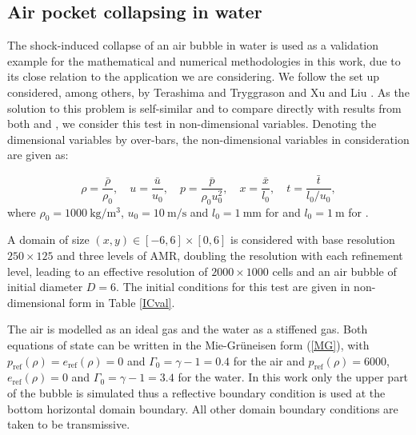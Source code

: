 \documentclass[3p,times,twocolumn]{elsarticle}
\begin{document}
\subsection{Air pocket collapsing in water}

The shock-induced collapse of an air bubble in water is used as a validation example for the mathematical and numerical methodologies in this work, due to its close relation to the application we are considering. We follow the set up considered, among others, by Terashima and Tryggrason \cite{terashima2010front} and Xu and Liu \cite{xu2017explicit}. As the solution to this problem is self-similar and to compare directly with results from both  \cite{terashima2010front} and \cite{xu2017explicit}, we consider this test in non-dimensional variables. Denoting the dimensional variables by over-bars, the non-dimensional variables in consideration are given as:

\begin{equation}
\rho=\frac{\bar{\rho}}{\rho_0}, \quad u=\frac{\bar{u}}{u_0}, \quad p=\frac{\bar{p}}{\rho_0u_0^2}, \quad x=\frac{\bar{x}}{l_0}, \quad t=\frac{\bar{t}}{l_0/u_0},
\end{equation}
where $\rho_0=\SI{1000}{\kilogram \per \meter \tothe{3}}$, $u_0=\SI{10}{\meter \per \second}$ and $l_0=\SI{1}{\milli \meter}$ for \cite{terashima2010front} and $l_0=\SI{1}{\meter}$ for \cite{xu2017explicit}.

A domain of size $(x,y)\in[-6,6]\times[0,6]$ is considered with base resolution $250\times125$ and three levels of AMR, doubling the resolution with each refinement level, leading to an effective resolution of $2000\times1000$ cells and an air bubble of initial diameter $D=6$. The initial conditions for this test are given  in non-dimensional form in Table \ref{ICval}.

The air is modelled as an ideal gas and the water as a stiffened gas. Both equations of state can be written in the Mie-Gr\"uneisen form (\ref{MG}), with $p_{\text{ref}}(\rho)=e_{\text{ref}}(\rho)=0$ and $\Gamma_0 = \gamma - 1 = 0.4$ for the air and  $p_{\text{ref}}(\rho)=6000$, $e_{\text{ref}}(\rho)=0$ and $\Gamma_0 = \gamma - 1 = 3.4$ for the water. In this work only the upper part of the bubble is simulated thus a reflective boundary condition is used at the bottom horizontal domain boundary. All other domain boundary conditions are taken to be transmissive.
\end{document}

